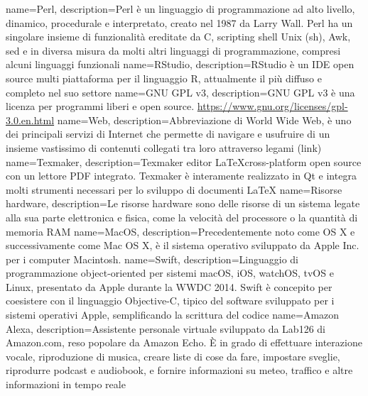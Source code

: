  {
	name=Perl,
	description={Perl è un linguaggio di programmazione ad alto livello, dinamico, procedurale e interpretato, creato nel 1987 da Larry Wall. Perl ha un singolare insieme di funzionalità ereditate da C, scripting shell Unix (sh), Awk, sed e in diversa misura da molti altri linguaggi di programmazione, compresi alcuni linguaggi funzionali}
}
 {
	name=RStudio,
	description={RStudio è un IDE open source multi piattaforma per il linguaggio R, attualmente il più diffuso e completo nel suo settore}
}
 {
	name=GNU GPL v3,
	description={GNU GPL v3 è una licenza per programmi liberi e open source. \url{https://www.gnu.org/licenses/gpl-3.0.en.html}}
}
 {
	name=Web,
	description={Abbreviazione di World Wide Web, è uno dei principali servizi di Internet che permette di navigare e usufruire di un insieme vastissimo di contenuti collegati tra loro attraverso legami (link)}
}
 {
	name=Texmaker,
	description={Texmaker editor \LaTeX cross-platform open source con un lettore PDF integrato. Texmaker è interamente realizzato in Qt e integra molti strumenti necessari per lo sviluppo di documenti \LaTeX}
}
 {
	name=Risorse hardware,
	description={Le risorse hardware sono delle risorse di un sistema legate alla sua parte elettronica e fisica, come la velocità del processore o la quantità di memoria RAM}
}
 {
	name=MacOS,
	description={Precedentemente noto come OS X e successivamente come Mac OS X, è il sistema operativo sviluppato da Apple Inc. per i computer Macintosh.}
}
 {
	name=Swift,
	description={Linguaggio di programmazione object-oriented per sistemi macOS, iOS, watchOS, tvOS e Linux, presentato da Apple durante la WWDC 2014. Swift è concepito per coesistere con il linguaggio Objective-C, tipico del software sviluppato per i sistemi operativi Apple, semplificando la scrittura del codice}
}
 {
	name=Amazon Alexa,
	description={Assistente personale virtuale sviluppato da Lab126 di Amazon.com, reso popolare da Amazon Echo. È in grado di effettuare interazione vocale, riproduzione di musica, creare liste di cose da fare, impostare sveglie, riprodurre podcast e audiobook, e fornire informazioni su meteo, traffico e altre informazioni in tempo reale}
}
